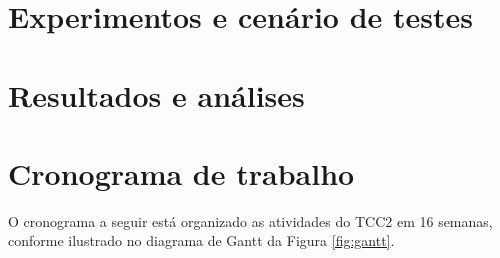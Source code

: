 \documentclass[
    12pt,                %
    openright,           %
    oneside,             %
    a4paper,             %
    english,             %
    brazil               %
]{abntex2}
\begin{document}
\section{Experimentos e cenário de testes}
\label{sec:experimentos}

\section{Resultados e análises}
\label{sec:resultados}

\section{Cronograma de trabalho}
\label{sec:cronograma}

O cronograma a seguir está organizado as atividades do TCC2 em 16 semanas, conforme ilustrado no diagrama de Gantt da Figura \ref{fig:gantt}.
\end{document}
